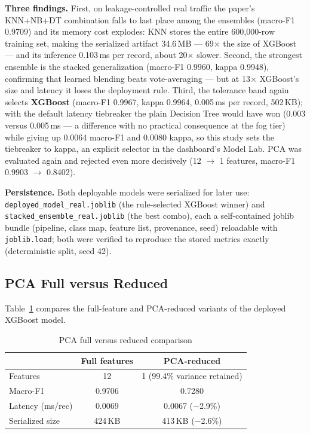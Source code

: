 \documentclass[12pt,a4paper]{article}
\begin{document}
\textbf{Three findings.} First, on leakage-controlled real traffic the paper's
KNN+NB+DT combination falls to last place among the ensembles (macro-F1 0.9709) and
its memory cost explodes: KNN stores the entire 600{,}000-row training set, making
the serialized artifact 34.6\,MB --- 69$\times$ the size of XGBoost --- and its
inference 0.103\,ms per record, about 20$\times$ slower. Second, the strongest
ensemble is the stacked generalization (macro-F1 0.9960, kappa 0.9948), confirming
that learned blending beats vote-averaging --- but at 13$\times$ XGBoost's size and
latency it loses the deployment rule. Third, the tolerance band again selects
\textbf{XGBoost} (macro-F1 0.9967, kappa 0.9964, 0.005\,ms per record, 502\,KB);
with the default latency tiebreaker the plain Decision Tree would have won (0.003
versus 0.005\,ms --- a difference with no practical consequence at the fog tier)
while giving up 0.0064 macro-F1 and 0.0080 kappa, so this study sets the tiebreaker
to kappa, an explicit selector in the dashboard's Model Lab. PCA was evaluated again
and rejected even more decisively (12 $\rightarrow$ 1 features, macro-F1 0.9903
$\rightarrow$ 0.8402).

\textbf{Persistence.} Both deployable models were serialized for later use:
\texttt{deployed\_model\_real.joblib} (the rule-selected XGBoost winner) and
\texttt{stacked\_ensemble\_real.joblib} (the best combo), each a self-contained
joblib bundle (pipeline, class map, feature list, provenance, seed) reloadable with
\texttt{joblib.load}; both were verified to reproduce the stored metrics exactly
(deterministic split, seed 42).

\subsection{PCA Full versus Reduced}
Table~\ref{tab:pca} compares the full-feature and PCA-reduced variants of the
deployed XGBoost model.

\begin{table}[H]
\caption{PCA full versus reduced comparison}
\label{tab:pca}
\centering
\small
\begin{tabular}{lcc}
\toprule
 & \textbf{Full features} & \textbf{PCA-reduced}\\
\midrule
Features & 12 & 1 (99.4\% variance retained)\\
Macro-F1 & 0.9706 & 0.7280\\
Latency (ms/rec) & 0.0069 & 0.0067 ($-$2.9\%)\\
Serialized size & 424\,KB & 413\,KB ($-$2.6\%)\\
\bottomrule
\end{tabular}
\end{table}
\end{document}
